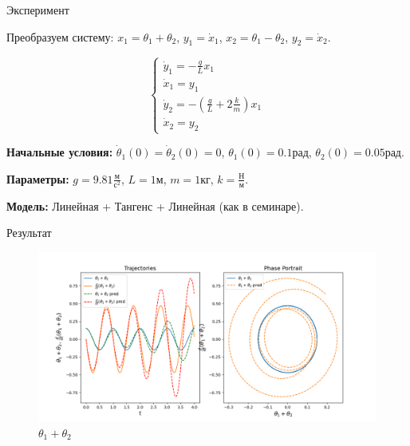 \documentclass{beamer}
\begin{document}
\begin{frame}{Эксперимент}

    Преобразуем систему: $x_1 = \theta_1 + \theta_2$, $y_1 = \dot x_1$, $x_2 = \theta_1 - \theta_2$, $y_2 = \dot x_2$.

    \begin{equation*}
        \begin{cases}
            \dot y_1 = - \frac{g}{L} x_1\\
            \dot x_1 = y_1\\
            \dot y_2 = - (\frac{g}{L} + 2 \frac{k}{m}) x_1\\
            \dot x_2 = y_2
        \end{cases}
    \end{equation*}

    \textbf{Начальные условия:} $\dot \theta_1(0) = \dot \theta_2(0) = 0$, $\theta_1(0) = 0.1 \text{рад}$, $\theta_2(0) = 0.05 \text{рад}$. 
    
    \textbf{Параметры:} $g = 9.81 \frac{\text{м}}{\text{с}^2}$, $L = 1 \text{м}$, $m = 1 \text{кг}$, $k = \frac{\text{Н}}{\text{м}}$.

    \textbf{Модель:} Линейная + Тангенс + Линейная (как в семинаре).
    
\end{frame}


\begin{frame}{Результат}

  \begin{figure}
    \centering
     \includegraphics[width = 1 \textwidth]{images/Graph_sum.png}
     \caption{$\theta_1 + \theta_2$}
  \end{figure}
\end{frame}
\end{document}
